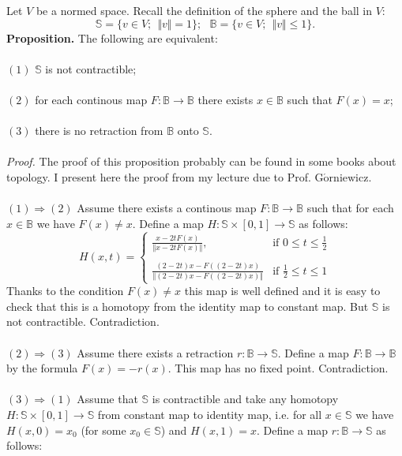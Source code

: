 \documentclass[12pt]{article}
\begin{document}
Let $V$ be a normed space. Recall the definition of the sphere and the ball in $V$:
$$\mathbb{S}=\{v\in V;\ \ \Vert v\Vert =1\};\ \ \ \mathbb{B}=\{v\in V;\ \ \Vert v\Vert\leq 1\}.$$
\textbf{Proposition.} The following are equivalent:\\ \\
$\mathrm{(1)}$ $\mathbb{S}$ is not contractible;\\ \\ 
$\mathrm{(2)}$ for each continous map $F:\mathbb{B}\rightarrow\mathbb{B}$ there exists $x\in\mathbb{B}$ such that $F(x)=x$;\\ \\ 
$\mathrm{(3)}$ there is no retraction from $\mathbb{B}$ onto $\mathbb{S}$.\\ \\ 
\textit{Proof.} The proof of this proposition probably can be found in some books about topology. I present here the proof from my lecture due to Prof. $\mathrm{G\acute{o}rniewicz}$.\\ \\ 
$\mathrm{(1)}\Rightarrow\mathrm{(2)}$ Assume there exists a continous map $F:\mathbb{B}\rightarrow\mathbb{B}$ such that for each $x\in\mathbb{B}$ we have $F(x)\neq x$. Define a map $H:\mathbb{S}\times [0,1]\rightarrow\mathbb{S}$ as follows:
$$H(x,t)=\left\{\begin{matrix} \frac{x-2tF(x)}{\Vert x-2tF(x)\Vert}, & \mbox{if }0\leq t\leq \frac{1}{2} \\ & \\ \frac{(2-2t)x-F((2-2t)x)}{\Vert (2-2t)x-F((2-2t)x)\Vert} & \mbox{if }\frac{1}{2}\leq t\leq 1\end{matrix}\right.$$
Thanks to the condition $F(x)\neq x$ this map is well defined and it is easy to check that this is a homotopy from the identity map to constant map. But $\mathbb{S}$ is not contractible. Contradiction.\\ \\
$\mathrm{(2)}\Rightarrow\mathrm{(3)}$ Assume there exists a retraction $r:\mathbb{B}\rightarrow\mathbb{S}$. Define a map $F:\mathbb{B}\rightarrow\mathbb{B}$ by the formula $F(x)=-r(x)$. This map has no fixed point. Contradiction.\\ \\
$\mathrm{(3)}\Rightarrow\mathrm{(1)}$ Assume that $\mathbb{S}$ is contractible and take any homotopy $H:\mathbb{S}\times [0,1]\rightarrow\mathbb{S}$ from constant map to identity map, i.e. for all $x\in\mathbb{S}$ we have $H(x,0)=x_0$ (for some $x_0\in\mathbb{S}$) and $H(x,1)=x$. Define a map $r:\mathbb{B}\rightarrow\mathbb{S}$ as follows:
\end{document}
